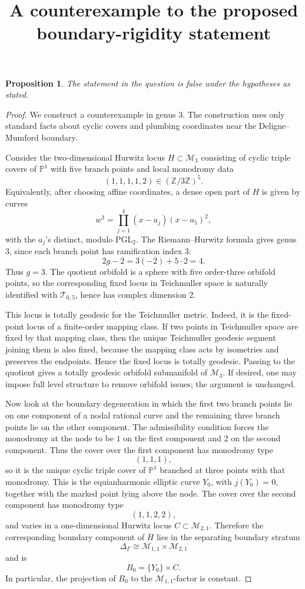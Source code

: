 \documentclass[11pt]{article}
\newcommand{\DeltaG}{\Delta_{\Gamma}}
\newtheorem{proposition}{Proposition}
\begin{document}
\title{A counterexample to the proposed boundary-rigidity statement}
\author{}
\date{}
\maketitle

\begin{proposition}
The statement in the question is false under the hypotheses as stated.
\end{proposition}

\begin{proof}
We construct a counterexample in genus \(3\).  The construction uses only standard
facts about cyclic covers and plumbing coordinates near the Deligne--Mumford
boundary.

Consider the two-dimensional Hurwitz locus \(H \subset \mathcal M_3\) consisting
of cyclic triple covers of \(\mathbb P^1\) with five branch points and local
monodromy data
\[
(1,1,1,1,2) \in (\mathbb Z/3\mathbb Z)^5.
\]
Equivalently, after choosing affine coordinates, a dense open part of \(H\) is
given by curves
\[
w^3=\prod_{j=1}^4 (x-a_j)(x-a_5)^2,
\]
with the \(a_j\)'s distinct, modulo \(\mathrm{PGL}_2\).  The Riemann--Hurwitz
formula gives genus \(3\), since each branch point has ramification index \(3\):
\[
2g-2 = 3(-2)+5\cdot 2 =4.
\]
Thus \(g=3\).  The quotient orbifold is a sphere with five order-three orbifold
points, so the corresponding fixed locus in Teichmuller space is naturally
identified with \(\mathcal T_{0,5}\), hence has complex dimension \(2\).

This locus is totally geodesic for the Teichmuller metric.  Indeed, it is the
fixed-point locus of a finite-order mapping class.  If two points in Teichmuller
space are fixed by that mapping class, then the unique Teichmuller geodesic
segment joining them is also fixed, because the mapping class acts by isometries
and preserves the endpoints.  Hence the fixed locus is totally geodesic.  Passing
to the quotient gives a totally geodesic orbifold submanifold of \(\mathcal M_3\).
If desired, one may impose full level structure to remove orbifold issues; the
argument is unchanged.

Now look at the boundary degeneration in which the first two branch points lie
on one component of a nodal rational curve and the remaining three branch points
lie on the other component.  The admissibility condition forces the monodromy at
the node to be \(1\) on the first component and \(2\) on the second component.
Thus the cover over the first component has monodromy type
\[
(1,1,1),
\]
so it is the unique cyclic triple cover of \(\mathbb P^1\) branched at three
points with that monodromy.  This is the equianharmonic elliptic curve
\(Y_0\), with \(j(Y_0)=0\), together with the marked point lying above the node.
The cover over the second component has monodromy type
\[
(1,1,2,2),
\]
and varies in a one-dimensional Hurwitz locus \(C \subset \mathcal M_{2,1}\).
Therefore the corresponding boundary component of \(\overline H\) lies in the
separating boundary stratum
\[
\DeltaG \cong \mathcal M_{1,1}\times \mathcal M_{2,1}
\]
and is
\[
B_0=\{Y_0\}\times C .
\]
In particular, the projection of \(B_0\) to the \(\mathcal M_{1,1}\)-factor is
constant.


\end{proof}
\end{document}
